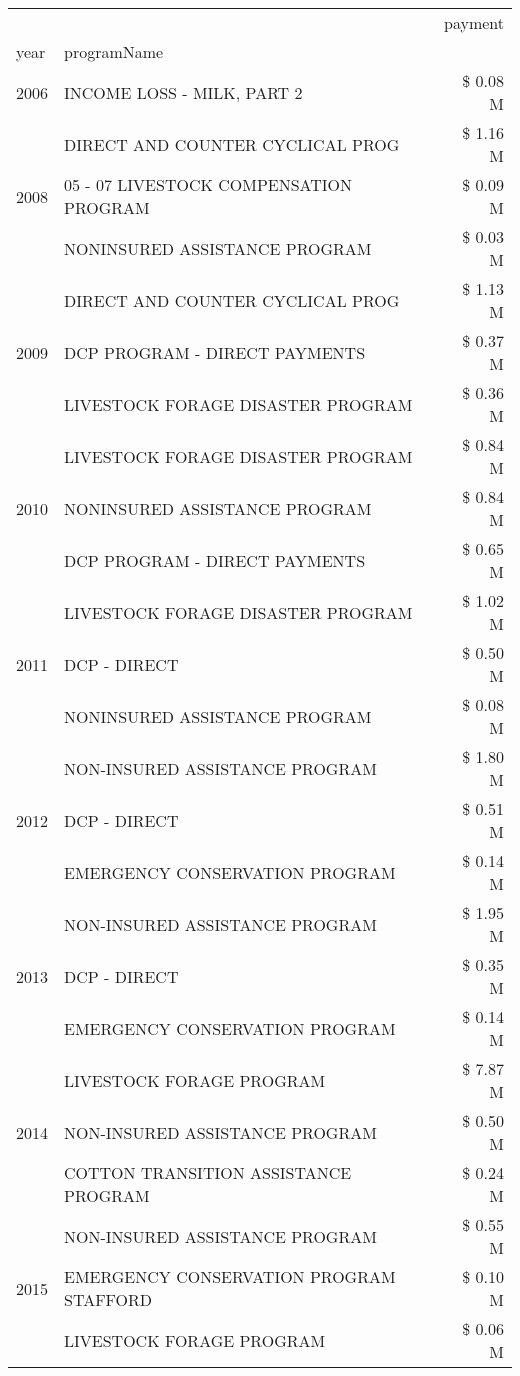 \begin{tabular}{llr}
\toprule
 &  & payment \\
year & programName &  \\
\midrule
2006 & INCOME LOSS - MILK, PART 2 & \$ 0.08 M \\
\cline{1-3}
\multirow[t]{3}{*}{2008} & DIRECT AND COUNTER CYCLICAL PROG & \$ 1.16 M \\
 & 05 - 07 LIVESTOCK COMPENSATION PROGRAM & \$ 0.09 M \\
 & NONINSURED ASSISTANCE PROGRAM & \$ 0.03 M \\
\cline{1-3}
\multirow[t]{3}{*}{2009} & DIRECT AND COUNTER CYCLICAL PROG & \$ 1.13 M \\
 & DCP PROGRAM - DIRECT PAYMENTS & \$ 0.37 M \\
 & LIVESTOCK FORAGE DISASTER  PROGRAM & \$ 0.36 M \\
\cline{1-3}
\multirow[t]{3}{*}{2010} & LIVESTOCK FORAGE DISASTER  PROGRAM & \$ 0.84 M \\
 & NONINSURED ASSISTANCE PROGRAM & \$ 0.84 M \\
 & DCP PROGRAM - DIRECT PAYMENTS & \$ 0.65 M \\
\cline{1-3}
\multirow[t]{3}{*}{2011} & LIVESTOCK FORAGE DISASTER PROGRAM & \$ 1.02 M \\
 & DCP - DIRECT & \$ 0.50 M \\
 & NONINSURED ASSISTANCE PROGRAM & \$ 0.08 M \\
\cline{1-3}
\multirow[t]{3}{*}{2012} & NON-INSURED ASSISTANCE PROGRAM & \$ 1.80 M \\
 & DCP - DIRECT & \$ 0.51 M \\
 & EMERGENCY CONSERVATION PROGRAM & \$ 0.14 M \\
\cline{1-3}
\multirow[t]{3}{*}{2013} & NON-INSURED ASSISTANCE PROGRAM & \$ 1.95 M \\
 & DCP - DIRECT & \$ 0.35 M \\
 & EMERGENCY CONSERVATION PROGRAM & \$ 0.14 M \\
\cline{1-3}
\multirow[t]{3}{*}{2014} & LIVESTOCK FORAGE PROGRAM & \$ 7.87 M \\
 & NON-INSURED ASSISTANCE PROGRAM & \$ 0.50 M \\
 & COTTON TRANSITION ASSISTANCE PROGRAM & \$ 0.24 M \\
\cline{1-3}
\multirow[t]{3}{*}{2015} & NON-INSURED ASSISTANCE PROGRAM & \$ 0.55 M \\
 & EMERGENCY CONSERVATION PROGRAM STAFFORD & \$ 0.10 M \\
 & LIVESTOCK FORAGE PROGRAM & \$ 0.06 M \\

\end{tabular}
